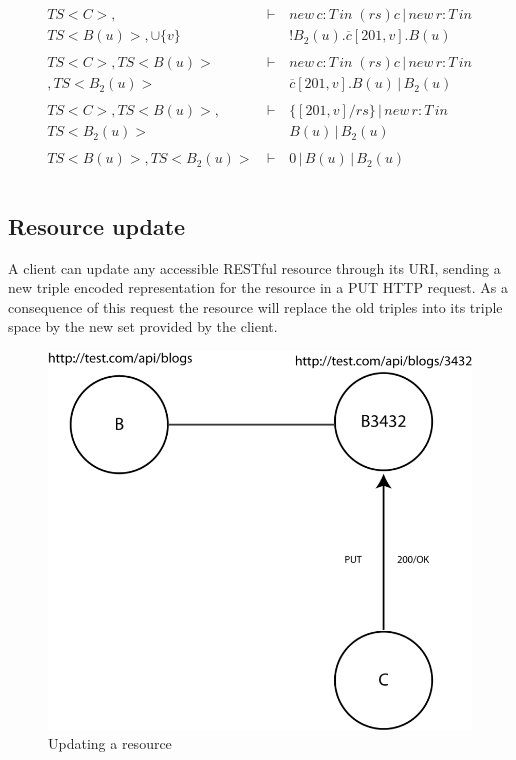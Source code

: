 \begin{eqnarray*}
 \ TS<C>,&\vdash\,& new\,c:T\,in\;(rs)c\,|\,new\,r:T\,in\;\\
 \ TS<B(u)>,\cup\{v\}\, &\,      & !B_2(u).\overline{c}[201,v].B(u) \\
 \               &        & \\
 \ TS<C>,TS<B(u)>\, &\vdash\,& new\,c:T\,in\;(rs)c\,|\,new\,r:T\,in\;\\
 \ ,TS<B_2(u)>              &\,      & \overline{c}[201,v].B(u)\,|\,B_2(u) \\
 \               &        & \\
 \ TS<C>,TS<B(u)>,\, &\vdash\,& \{[201,v]/rs\}\,|\,new\,r:T\,in\;\\
 \ TS<B_2(u)>              &\,      & B(u)\,|\,B_2(u) \\
 \               &        & \\
 \ TS<B(u)>,TS<B_2(u)>\, &\vdash\,& 0\,|\,B(u)\,|\,B_2(u) \\
 \               &        & \\
\end{eqnarray*}

\subsection{Resource update}

A client can update any accessible RESTful resource through its URI, sending a new triple encoded representation for the resource in a PUT HTTP request. As a consequence of this request the resource will replace the old triples into its triple space by the new set provided by the client.

\begin{figure}[htb!]
\centering%
\includegraphics{put_ex.png}
\caption{Updating a resource}
\end{figure}

